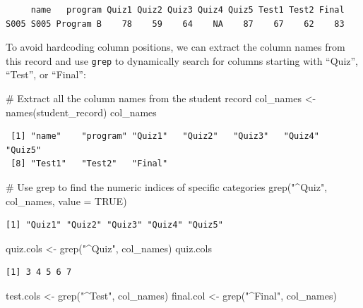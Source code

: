\documentclass[
  letterpaper,
  DIV=11,
  numbers=noendperiod]{scrreprt}
\newenvironment{Shaded}{\begin{snugshade}}{\end{snugshade}}
\newcommand{\AttributeTok}[1]{\textcolor[rgb]{0.40,0.45,0.13}{#1}}
\newcommand{\CommentTok}[1]{\textcolor[rgb]{0.37,0.37,0.37}{#1}}
\newcommand{\ConstantTok}[1]{\textcolor[rgb]{0.56,0.35,0.01}{#1}}
\newcommand{\FunctionTok}[1]{\textcolor[rgb]{0.28,0.35,0.67}{#1}}
\newcommand{\NormalTok}[1]{\textcolor[rgb]{0.00,0.23,0.31}{#1}}
\newcommand{\OtherTok}[1]{\textcolor[rgb]{0.00,0.23,0.31}{#1}}
\newcommand{\StringTok}[1]{\textcolor[rgb]{0.13,0.47,0.30}{#1}}
\begin{document}
\begin{verbatim}
     name   program Quiz1 Quiz2 Quiz3 Quiz4 Quiz5 Test1 Test2 Final
S005 S005 Program B    78    59    64    NA    87    67    62    83
\end{verbatim}

To avoid hardcoding column positions, we can extract the column names
from this record and use \texttt{grep} to dynamically search for columns
starting with ``Quiz'', ``Test'', or ``Final'':

\begin{Shaded}
\begin{Highlighting}[]
\CommentTok{\# Extract all the column names from the student record}
\NormalTok{col\_names }\OtherTok{\textless{}{-}} \FunctionTok{names}\NormalTok{(student\_record)}
\NormalTok{col\_names}
\end{Highlighting}
\end{Shaded}

\begin{verbatim}
 [1] "name"    "program" "Quiz1"   "Quiz2"   "Quiz3"   "Quiz4"   "Quiz5"  
 [8] "Test1"   "Test2"   "Final"  
\end{verbatim}

\begin{Shaded}
\begin{Highlighting}[]
\CommentTok{\# Use grep to find the numeric indices of specific categories}
\FunctionTok{grep}\NormalTok{(}\StringTok{"\^{}Quiz"}\NormalTok{, col\_names, }\AttributeTok{value =} \ConstantTok{TRUE}\NormalTok{)}
\end{Highlighting}
\end{Shaded}

\begin{verbatim}
[1] "Quiz1" "Quiz2" "Quiz3" "Quiz4" "Quiz5"
\end{verbatim}

\begin{Shaded}
\begin{Highlighting}[]
\NormalTok{quiz.cols }\OtherTok{\textless{}{-}} \FunctionTok{grep}\NormalTok{(}\StringTok{"\^{}Quiz"}\NormalTok{, col\_names)}
\NormalTok{quiz.cols}
\end{Highlighting}
\end{Shaded}

\begin{verbatim}
[1] 3 4 5 6 7
\end{verbatim}

\begin{Shaded}
\begin{Highlighting}[]
\NormalTok{test.cols }\OtherTok{\textless{}{-}} \FunctionTok{grep}\NormalTok{(}\StringTok{"\^{}Test"}\NormalTok{, col\_names)}
\NormalTok{final.col }\OtherTok{\textless{}{-}} \FunctionTok{grep}\NormalTok{(}\StringTok{"\^{}Final"}\NormalTok{, col\_names)}
\end{Highlighting}
\end{Shaded}
\end{document}
